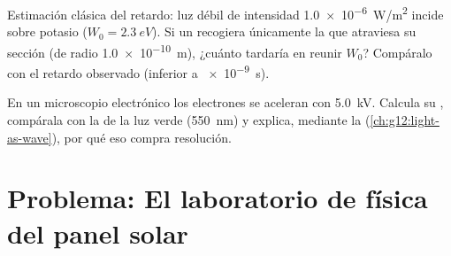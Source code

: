 \begin{exercise}[$\star\star\star$]\label{exo:g12:quantum-world:14}
Estimación clásica del retardo: luz débil de intensidad \qty{1.0e-6}{W/m^2} incide
sobre potasio ($W_0 = \qty{2.3}{eV}$). Si un  recogiera únicamente la  que
atraviesa su sección  (de radio \qty{1.0e-10}{m}), ¿cuánto tardaría en
reunir $W_0$? Compáralo con el retardo observado (inferior a \qty{e-9}{s}).
\end{exercise}

\begin{exercise}[$\star\star\star$]\label{exo:g12:quantum-world:15}
En un microscopio electrónico los electrones se aceleran con \qty{5.0}{kV}. Calcula su
, compárala con la de la luz verde (\qty{550}{nm}) y
explica, mediante la  (\cref{ch:g12:light-as-wave}), por qué eso compra
resolución.
\end{exercise}

\section{Problema: El laboratorio de física del panel solar}


